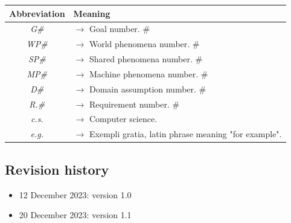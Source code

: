 \documentclass{article}
\begin{document}
{\begin{xltabular}{\textwidth}{ >{\raggedright\arraybackslash}c >{\raggedright\arraybackslash}X }
    \endfirsthead

    \hline
    \textbf{Abbreviation} & \textbf{Meaning} \\
    \hline

    \endhead
    \endfoot
    \endlastfoot

    \textit{G\#} & $\rightarrow$ Goal number. \#
    \\
    \textit{WP\#} & $\rightarrow$ World phenomena number. \#
    \\
    \textit{SP\#} & $\rightarrow$ Shared phenomena number. \#
    \\
    \textit{MP\#} & $\rightarrow$ Machine phenomena number. \#
    \\
    \textit{D\#} & $\rightarrow$ Domain assumption number. \#
    \\
    \textit{R.\#} & $\rightarrow$ Requirement number. \#
    \\
    \textit{c.s.} & $\rightarrow$ Computer science.
    \\
    \textit{e.g.} & $\rightarrow$ Exempli gratia, latin phrase meaning "for example".
\end{xltabular}

\subsection{Revision history}
\begin{itemize}
    \item 12 December 2023: version 1.0
    \item 20 December 2023: version 1.1
\end{itemize}
}
\end{document}
